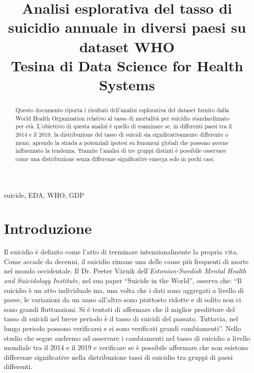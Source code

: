 \documentclass[conference]{IEEEtran}
\begin{document}
\title{Analisi esplorativa del tasso di suicidio annuale in diversi paesi su dataset WHO\\
{\footnotesize Tesina di Data Science for Health Systems}
}

\author{
}

\maketitle

\begin{abstract}
Questo documento riporta i risultati dell'analisi esplorativa del dataset fornito dalla
World Health Organization relativo al tasso di mortalità per suicidio standardizzato per età.
L'obiettivo di questa analisi è quello di esaminare se, in differenti paesi tra il 2014 e il 2019,
la distribuzione del tasso di suicidi sia significativamente differente o meno,
aprendo la strada a potenziali
ipotesi su fenomeni globali che possono averne influenzato la tendenza.
Tramite l'analisi di tre gruppi distinti è possibile osservare come una
distribuzione senza differenze significative emerga solo in pochi casi.
\end{abstract}

\begin{IEEEkeywords}
suicide, EDA, WHO, GDP
\end{IEEEkeywords}

\section{Introduzione}
Il suicidio è definito come l'atto di terminare intenzionalmente la propria vita\cite{b1}.
Come accade da decenni, il suicidio rimane una delle cause più
frequenti di morte nel mondo occidentale\cite{b2}.
Il Dr. Peeter V\"arnik dell'\emph{Estonian-Swedish Mental Health
and Suicidology Institute}, nel suo paper ``Suicide in the World''\cite{b3}, 
osserva che:
``Il suicidio è un atto individuale ma, una volta che i dati sono aggregati a
livello di paese, le variazioni da un anno all'altro sono piuttosto ridotte e
di solito non ci sono grandi fluttuazioni. Si è tentati di affermare che
il miglior predittore del tasso di suicidi nel breve periodo è il tasso di suicidi del passato.
Tuttavia, nel lungo periodo possono verificarsi e si sono verificati grandi cambiamenti''.
Nello studio che segue andremo ad osservare i cambiamenti nel tasso di suicidio 
a livello mondiale tra il 2014 e il 2019 e verificare se è possibile affermare
che non esistono differenze significative nella distribuzione tassi di suicidio
tra gruppi di paesi differenti.
\end{document}
